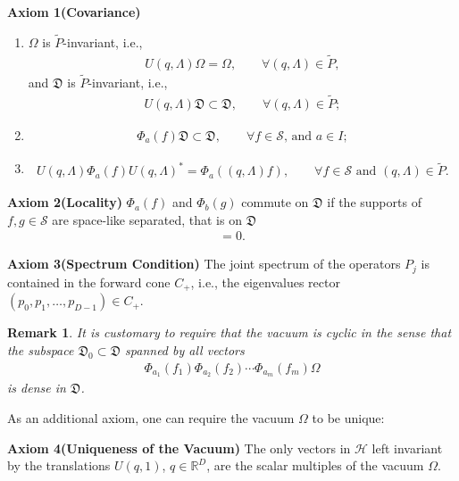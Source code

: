 \documentclass[a4paper,10pt]{amsart}
\newtheorem{remark}{Remark}[section]
\newcommand{\HHH}{\mathcal H} %
\newcommand{\SSS}{\mathcal S}
\newcommand{\DDD}{\mathfrak D}
\newcommand{\PPP}{\widetilde{P}}
\newcommand{\R}{\mathbb R}  %
\begin{document}
\textbf{Axiom 1(Covariance)}
\begin{enumerate}
    \item $\Omega$ is $\PPP$-invariant, i.e., 
        \begin{align*}
            U(q, \Lambda) \Omega = \Omega, \qquad \forall (q, \Lambda) \in
            \PPP,
        \end{align*}
        and $\DDD$ is $\PPP$-invariant, i.e.,
        \begin{align*}
            U(q, \Lambda) \DDD \subset \DDD, 
            \qquad \forall (q, \Lambda) \in
            \PPP;
        \end{align*}
      \item 
          \begin{align*}
              \Phi_{a}(f) \DDD \subset \DDD, \qquad \forall f \in \SSS
              \mbox{, and } a \in I;
          \end{align*}
      \item 
          \begin{align*}
              U(q, \Lambda)\Phi_{a}(f)U(q, \Lambda)^{*} = 
              \Phi_{a}((q,\Lambda)f), \qquad \forall f \in \SSS
              \mbox{ and } (q, \Lambda) \in \PPP.
          \end{align*}
\end{enumerate}

\textbf{Axiom 2(Locality)} $\Phi_{a}(f)$ and $\Phi_{b}(g)$ commute on 
$\DDD$ if the supports of $f, g \in \SSS$ are space-like separated, that
is on $\DDD$
\begin{align*}
    [\Phi_a(f), \Phi_b(f)] = 0. 
\end{align*}

\textbf{Axiom 3(Spectrum Condition)} The joint spectrum of the operators
$P_j$ is contained in the forward cone $C_{+}$, i.e.,
the eigenvalues rector $(p_0, p_1, \ldots, p_{D-1}) \in C_{+}$.

\begin{remark}
   It is customary to require that the vacuum is cyclic in the sense that
   the subspace $\DDD_{0} \subset \DDD$ spanned by all vectors
   \begin{align*}
       \Phi_{a_1}(f_1) \Phi_{a_2}(f_2)\cdots \Phi_{a_m}(f_m)\Omega  
   \end{align*}
   is dense in $\DDD$.
\end{remark}

As an additional axiom, one can require the vacuum $\Omega$ to be unique:

\textbf{Axiom 4(Uniqueness of the Vacuum)} The only vectors in $\HHH$ left
invariant by the translations $U(q,1)$, $q \in \R^{D}$, are the scalar
multiples of the vacuum $\Omega$.
\end{document}
